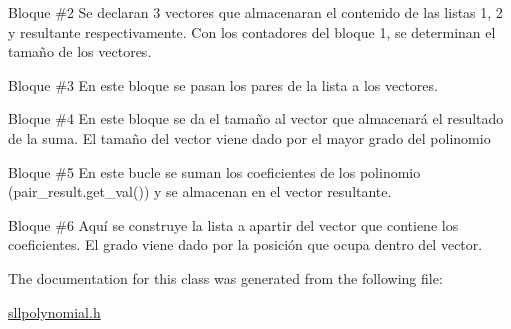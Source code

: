 Bloque \#2 Se declaran 3 vectores que almacenaran el contenido de las listas 1, 2 y resultante respectivamente. Con los contadores del bloque 1, se determinan el tamaño de los vectores.

Bloque \#3 En este bloque se pasan los pares de la lista a los vectores.

Bloque \#4 En este bloque se da el tamaño al vector que almacenará el resultado de la suma. El tamaño del vector viene dado por el mayor grado del polinomio

Bloque \#5 En este bucle se suman los coeficientes de los polinomio (pair\+\_\+result.\+get\+\_\+val()) y se almacenan en el vector resultante.

Bloque \#6 Aquí se construye la lista a apartir del vector que contiene los coeficientes. El grado viene dado por la posición que ocupa dentro del vector.

The documentation for this class was generated from the following file\+:\begin{DoxyCompactItemize}
\item 
\hyperlink{sllpolynomial_8h}{sllpolynomial.\+h}\end{DoxyCompactItemize}
